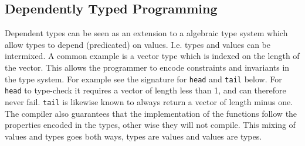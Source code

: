 \documentclass[parskip=half]{scrartcl}
\begin{document}
\subsection{Dependently Typed Programming}

Dependent types can be seen as an extension to a algebraic type system which
allow types to depend (predicated) on values. I.e. types and values can be
intermixed. A common example is a vector type which is indexed on the length of
the vector. This allows the programmer to encode constraints and invariants in
the type system. For example see the signature for \texttt{head} and
\texttt{tail} below.  For \texttt{head} to type-check it requires a vector of
length less than 1, and can therefore never fail. \texttt{tail} is likewise
known to always return a vector of length minus one. The compiler also
guarantees that the implementation of the functions follow the properties
encoded in the types, other wise they will not compile.  This mixing of values
and types goes both ways, types are values and values are types.






\end{document}
